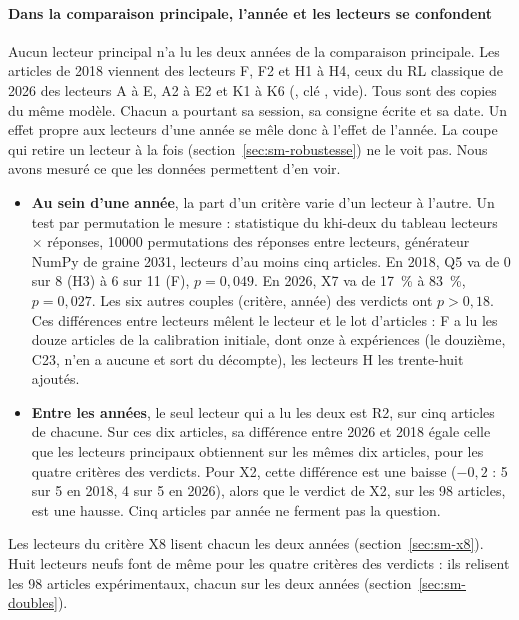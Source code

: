 \paragraph{Dans la comparaison principale, l'année et les lecteurs se confondent}\label{sec:sm-annees}
Aucun lecteur principal n'a lu les deux années de la comparaison principale. Les articles de 2018
viennent des lecteurs F, F2 et H1 à H4, ceux du RL classique de 2026 des lecteurs A à E, A2 à E2 et K1
à K6 (, clé , vide). Tous sont des copies
du même modèle. Chacun a pourtant sa session, sa consigne écrite et sa date. Un effet propre aux
lecteurs d'une année se mêle donc à l'effet de l'année. La coupe qui retire un lecteur à la fois
(section~\ref{sec:sm-robustesse}) ne le voit pas. Nous avons mesuré ce que les données permettent
d'en voir.
\begin{itemize}
  \item \textbf{Au sein d'une année}, la part d'un critère varie d'un lecteur à l'autre. Un test par
  permutation le mesure : statistique du khi-deux du tableau lecteurs $\times$ réponses,
  \num{10000} permutations des réponses entre lecteurs, générateur NumPy de graine 2031, lecteurs d'au
  moins cinq articles. En 2018, Q5 va de 0 sur 8 (H3) à 6 sur 11 (F), $p = 0{,}049$. En 2026, X7 va de
  17~\% à 83~\%, $p = 0{,}027$. Les six autres couples (critère, année) des verdicts ont $p > 0{,}18$.
  Ces différences entre lecteurs mêlent le lecteur et le lot d'articles : F a lu les douze articles de la calibration
  initiale, dont onze à expériences (le douzième, C23, n'en a aucune et sort du décompte), les lecteurs H
  les trente-huit ajoutés.
  \item \textbf{Entre les années}, le seul lecteur qui a lu les deux est R2, sur cinq articles de
  chacune. Sur ces dix articles, sa différence entre 2026 et 2018 égale celle que les lecteurs
  principaux obtiennent sur les mêmes dix articles, pour les quatre critères des verdicts. Pour X2,
  cette différence est une baisse ($-0{,}2$ : 5 sur 5 en 2018, 4 sur 5 en 2026), alors que le verdict
  de X2, sur les 98 articles, est une hausse. Cinq articles par année ne ferment pas la question.
\end{itemize}
Les lecteurs du critère X8 lisent chacun les deux années (section~\ref{sec:sm-x8}). Huit lecteurs
neufs font de même pour les quatre critères des verdicts : ils relisent les 98 articles expérimentaux,
chacun sur les deux années (section~\ref{sec:sm-doubles}).

